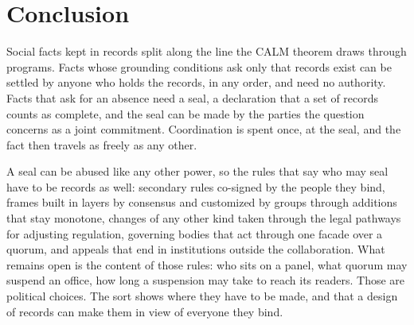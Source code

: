\section{Conclusion}\label{sec:conclusion}

Social facts kept in records split along the line the CALM theorem draws through programs. Facts
whose grounding conditions ask only that records exist can be settled by anyone who holds the
records, in any order, and need no authority. Facts that ask for an absence need a seal, a
declaration that a set of records counts as complete, and the seal can be made by the parties the
question concerns as a joint commitment. Coordination is spent once, at the seal, and the fact then
travels as freely as any other.

A seal can be abused like any other power, so the rules that say who may seal have to be records as
well: secondary rules co-signed by the people they bind, frames built in layers by consensus and
customized by groups through additions that stay monotone, changes of any other kind taken through
the legal pathways for adjusting regulation, governing bodies that act through one facade over a
quorum, and appeals that end in institutions outside the collaboration. What remains open is the
content of those rules: who sits on a panel, what quorum may suspend an office, how long a
suspension may take to reach its readers. Those are political choices. The sort shows where they have
to be made, and that a design of records can make them in view of everyone they bind.
